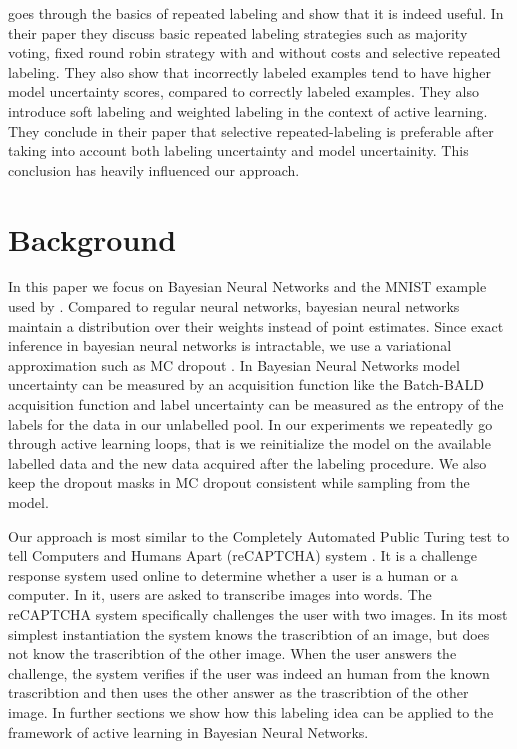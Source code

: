 \documentclass[twoside,11pt]{article}
\begin{document}
\cite{ipeirotis2014repeated} goes through the basics of repeated labeling and show that it is indeed useful. In their paper they discuss basic repeated labeling strategies such as majority voting, fixed round robin strategy with and without costs and selective repeated labeling. They also show that incorrectly labeled examples tend to have higher model uncertainty scores, compared to correctly labeled examples. They also introduce soft labeling and weighted labeling in the context of active learning. They conclude in their paper that selective repeated-labeling is preferable after taking into account both labeling uncertainty and model uncertainity. This conclusion has heavily influenced our approach.


\section{Background}

In this paper we focus on Bayesian Neural Networks and the MNIST example used by \cite{kirsch2019batchbald}. Compared to regular neural networks, bayesian neural networks maintain a distribution over their weights instead of point estimates. Since exact inference in bayesian neural networks is intractable, we use a variational approximation such as MC dropout \citep{gal2016dropout}. In Bayesian Neural Networks model uncertainty can be measured by an acquisition function like the Batch-BALD acquisition function and label uncertainty can be measured as the entropy of the labels for the data in our unlabelled pool. In our experiments we repeatedly go through active learning loops, that is we reinitialize the model on the available labelled data and the new data acquired after the labeling procedure. We also keep the dropout masks in MC dropout consistent while sampling from the model.

Our approach is most similar to the Completely Automated Public Turing test to tell Computers and Humans Apart (reCAPTCHA) system \cite{recaptcha}. It is a challenge response system used online to determine whether a user is a human or a computer. In it, users are asked to transcribe images into words. The reCAPTCHA system specifically challenges the user with two images. In its most simplest instantiation the system knows the trascribtion of an image, but does not know the trascribtion of the other image. When the user answers the challenge, the system verifies if the user was indeed an human from the known trascribtion and then uses the other answer as the trascribtion of the other image. In further sections we show how this labeling idea can be applied to the framework of active learning in Bayesian Neural Networks.
\end{document}
